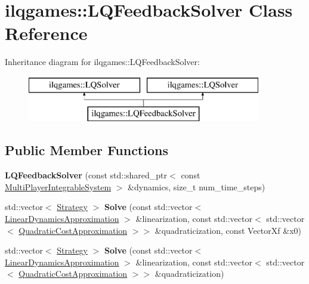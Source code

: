 \hypertarget{classilqgames_1_1_l_q_feedback_solver}{}\section{ilqgames\+:\+:L\+Q\+Feedback\+Solver Class Reference}
\label{classilqgames_1_1_l_q_feedback_solver}
Inheritance diagram for ilqgames\+:\+:L\+Q\+Feedback\+Solver\+:\begin{figure}[H]
\begin{center}
\leavevmode
\includegraphics[height=2.000000cm]{classilqgames_1_1_l_q_feedback_solver}
\end{center}
\end{figure}
\subsection*{Public Member Functions}
\begin{DoxyCompactItemize}
\item 
{\bfseries L\+Q\+Feedback\+Solver} (const std\+::shared\+\_\+ptr$<$ const \hyperlink{classilqgames_1_1_multi_player_integrable_system}{Multi\+Player\+Integrable\+System} $>$ \&dynamics, size\+\_\+t num\+\_\+time\+\_\+steps)\hypertarget{classilqgames_1_1_l_q_feedback_solver_ac320229137060866f2020773657995ba}{}\label{classilqgames_1_1_l_q_feedback_solver_ac320229137060866f2020773657995ba}

\item 
std\+::vector$<$ \hyperlink{structilqgames_1_1_strategy}{Strategy} $>$ {\bfseries Solve} (const std\+::vector$<$ \hyperlink{structilqgames_1_1_linear_dynamics_approximation}{Linear\+Dynamics\+Approximation} $>$ \&linearization, const std\+::vector$<$ std\+::vector$<$ \hyperlink{structilqgames_1_1_quadratic_cost_approximation}{Quadratic\+Cost\+Approximation} $>$$>$ \&quadraticization, const Vector\+Xf \&x0)\hypertarget{classilqgames_1_1_l_q_feedback_solver_a946d8c9d03cbcc65ca8a0ae390600890}{}\label{classilqgames_1_1_l_q_feedback_solver_a946d8c9d03cbcc65ca8a0ae390600890}

\item 
std\+::vector$<$ \hyperlink{structilqgames_1_1_strategy}{Strategy} $>$ {\bfseries Solve} (const std\+::vector$<$ \hyperlink{structilqgames_1_1_linear_dynamics_approximation}{Linear\+Dynamics\+Approximation} $>$ \&linearization, const std\+::vector$<$ std\+::vector$<$ \hyperlink{structilqgames_1_1_quadratic_cost_approximation}{Quadratic\+Cost\+Approximation} $>$$>$ \&quadraticization)\hypertarget{classilqgames_1_1_l_q_feedback_solver_a93adaa2320f75c9094095582cfdfd160}{}\label{classilqgames_1_1_l_q_feedback_solver_a93adaa2320f75c9094095582cfdfd160}

\end{DoxyCompactItemize}


